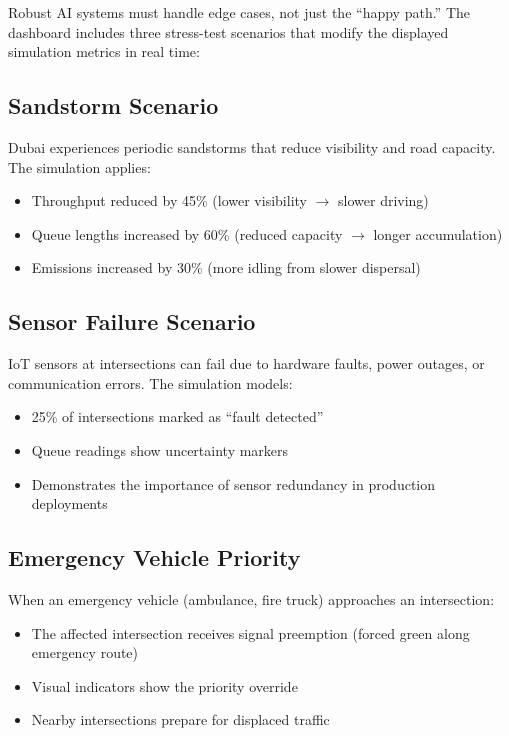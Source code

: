 \documentclass[12pt, a4paper]{article}
\begin{document}
Robust AI systems must handle edge cases, not just the ``happy path.'' The dashboard includes three stress-test scenarios that modify the displayed simulation metrics in real time:

\subsection{Sandstorm Scenario}
Dubai experiences periodic sandstorms that reduce visibility and road capacity. The simulation applies:
\begin{itemize}[nosep]
    \item Throughput reduced by 45\% (lower visibility $\rightarrow$ slower driving)
    \item Queue lengths increased by 60\% (reduced capacity $\rightarrow$ longer accumulation)
    \item Emissions increased by 30\% (more idling from slower dispersal)
\end{itemize}

\subsection{Sensor Failure Scenario}
IoT sensors at intersections can fail due to hardware faults, power outages, or communication errors. The simulation models:
\begin{itemize}[nosep]
    \item 25\% of intersections marked as ``fault detected''
    \item Queue readings show uncertainty markers
    \item Demonstrates the importance of sensor redundancy in production deployments
\end{itemize}

\subsection{Emergency Vehicle Priority}
When an emergency vehicle (ambulance, fire truck) approaches an intersection:
\begin{itemize}[nosep]
    \item The affected intersection receives signal preemption (forced green along emergency route)
    \item Visual indicators show the priority override
    \item Nearby intersections prepare for displaced traffic
\end{itemize}
\end{document}

